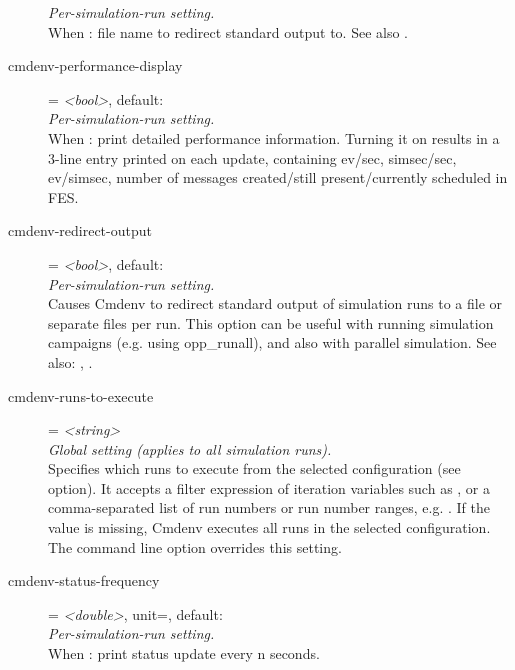 \begin{description}
    \textit{Per-simulation-run setting.}\\
    When
    :
    file name to redirect standard output to. See also
    .
\item[cmdenv-performance-display] = \textit{<bool>}, default: \\
    \textit{Per-simulation-run setting.}\\
    When :
    print detailed performance information. Turning it on results in a 3-line
    entry printed on each update, containing ev/sec, simsec/sec, ev/simsec,
    number of messages created/still present/currently scheduled in FES.
\item[cmdenv-redirect-output] = \textit{<bool>}, default: \\
    \textit{Per-simulation-run setting.}\\
    Causes Cmdenv to redirect standard output of simulation runs to a file or
    separate files per run. This option can be useful with running simulation
    campaigns (e.g. using opp\_runall), and also with parallel simulation. See
    also: ,
    .
\item[cmdenv-runs-to-execute] = \textit{<string>}\\
    \textit{Global setting (applies to all simulation runs).}\\
    Specifies which runs to execute from the selected configuration (see
     option). It accepts a
    filter expression of iteration variables such as , or
    a comma-separated list of run numbers or run number ranges, e.g.
    . If
    the value is missing, Cmdenv executes all runs in the selected
    configuration. The  command line option overrides this
    setting.
\item[cmdenv-status-frequency] = \textit{<double>}, unit=, default: \\
    \textit{Per-simulation-run setting.}\\
    When :
    print status update every n seconds.

\end{description}
